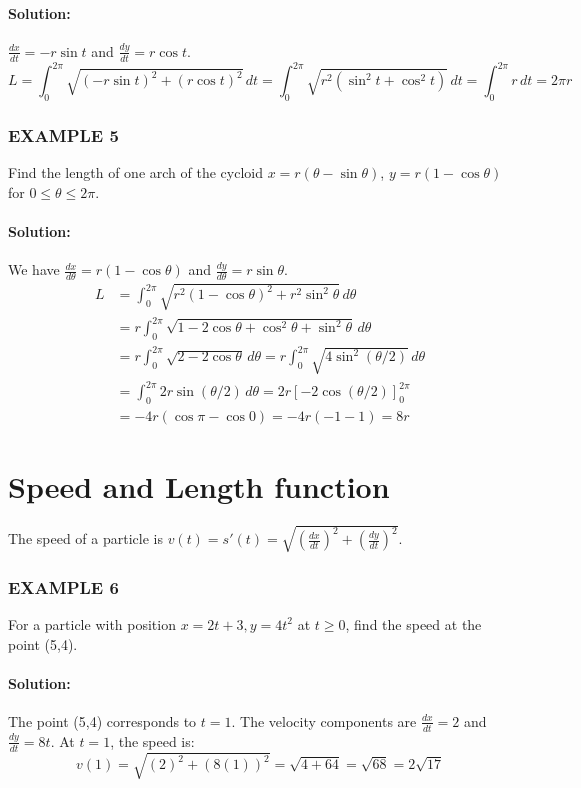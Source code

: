 \documentclass{article}
\begin{document}
\paragraph{Solution:}
$\frac{dx}{dt} = -r\sin t$ and $\frac{dy}{dt} = r\cos t$.
\[
L = \int_{0}^{2\pi} \sqrt{(-r\sin t)^2 + (r\cos t)^2} \, dt = \int_{0}^{2\pi} \sqrt{r^2(\sin^2 t + \cos^2 t)} \, dt = \int_{0}^{2\pi} r \, dt = 2\pi r
\]

\subsubsection*{EXAMPLE 5}
Find the length of one arch of the cycloid $x = r(\theta-\sin\theta)$, $y = r(1-\cos\theta)$ for $0 \le \theta \le 2\pi$.

\paragraph{Solution:}
We have $\frac{dx}{d\theta} = r(1-\cos\theta)$ and $\frac{dy}{d\theta} = r\sin\theta$.
\begin{align*}
    L &= \int_{0}^{2\pi} \sqrt{r^2(1-\cos\theta)^2 + r^2\sin^2\theta} \, d\theta \\
    &= r \int_{0}^{2\pi} \sqrt{1 - 2\cos\theta + \cos^2\theta + \sin^2\theta} \, d\theta \\
    &= r \int_{0}^{2\pi} \sqrt{2 - 2\cos\theta} \, d\theta = r \int_{0}^{2\pi} \sqrt{4\sin^2(\theta/2)} \, d\theta \\
    &= \int_{0}^{2\pi} 2r\sin(\theta/2) \, d\theta = 2r \left[ -2\cos(\theta/2) \right]_{0}^{2\pi} \\
    &= -4r(\cos\pi - \cos 0) = -4r(-1 - 1) = 8r
\end{align*}

\section*{Speed and Length function}
The speed of a particle is $v(t) = s'(t) = \sqrt{(\frac{dx}{dt})^2 + (\frac{dy}{dt})^2}$.

\subsubsection*{EXAMPLE 6}
For a particle with position $x=2t+3, y=4t^2$ at $t \ge 0$, find the speed at the point (5,4).

\paragraph{Solution:}
The point (5,4) corresponds to $t=1$. The velocity components are $\frac{dx}{dt}=2$ and $\frac{dy}{dt}=8t$. At $t=1$, the speed is:
\[
v(1) = \sqrt{(2)^2 + (8(1))^2} = \sqrt{4+64} = \sqrt{68} = 2\sqrt{17}
\]
\end{document}
